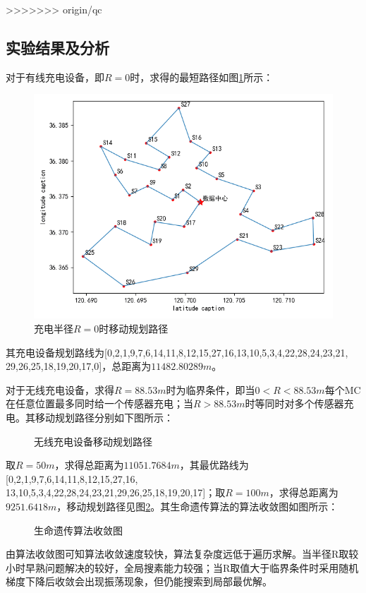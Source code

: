 \documentclass{whutmod}
\begin{document}
\begin{table}[H]
\begin{tablenotes}
>>>>>>> origin/qc
    \subsection{实验结果及分析}
        对于有线充电设备，即$R=0$时，求得的最短路径如图\ref{sssssssssss}所示：
        \begin{figure}[H]
        	\centering
        	\includegraphics[width=.6\textwidth]{figures/w1.png}
        	\caption{充电半径$R=0$时移动规划路径}\label{sssssssssss}
        \end{figure}
       其充电设备规划路线为[0,2,1,9,7,6,14,11,8,12,15,27,16,13,10,5,3,4,22,28,24,23,21,\\29,26,25,18,19,20,17,0]，总距离为$11482.80289m$。
        
        对于无线充电设备，求得$R=88.53m$时为临界条件，即当$0<R<88.53m$每个MC在任意位置最多同时给一个传感器充电；当$R>88.53m$时等同时对多个传感器充电。其移动规划路径分别如下图所示：
        \begin{figure}[H]
        	\centering
        	\caption{无线充电设备移动规划路径}
        	\label{ssw}
        \end{figure}
    
    取$R=50m$，求得总距离为$11051.7684m$，其最优路线为 [0,2,1,9,7,6,14,11,8,12,15,27,16,\\13,10,5,3,4,22,28,24,23,21,29,26,25,18,19,20,17]；取$R=100m$，求得总距离为$9251.6418m$，移动规划路径见图\ref{ssw}。其生命遗传算法的算法收敛图如图所示：
        \begin{figure}[H]
	\centering
	\caption{生命遗传算法收敛图}
		\end{figure}
	    由算法收敛图可知算法收敛速度较快，算法复杂度远低于遍历求解。当半径R取较小时早熟问题解决的较好，全局搜素能力较强；当R取值大于临界条件时采用随机梯度下降后收敛会出现振荡现象，但仍能搜索到局部最优解。
	

\end{tablenotes}
\end{table}
\end{document}
